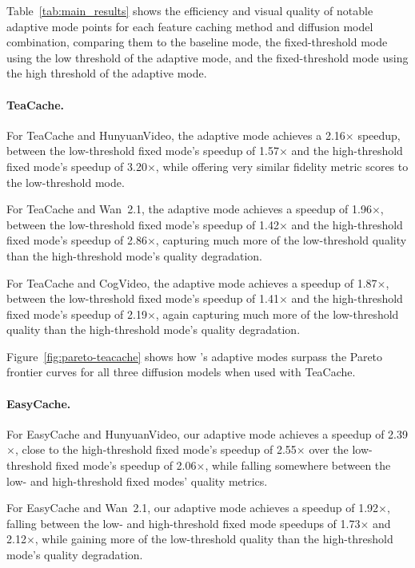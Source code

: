 \documentclass{article}
\begin{document}
Table~\ref{tab:main_results} shows the efficiency and visual quality of notable adaptive mode points for each feature caching method and diffusion model combination, comparing them to the baseline mode, the fixed-threshold mode using the low threshold of the adaptive mode, and the fixed-threshold mode using the high threshold of the adaptive mode.

\paragraph{TeaCache.}
For TeaCache and HunyuanVideo, the adaptive mode achieves a 2.16$\times$ speedup, between the low-threshold fixed mode's speedup of 1.57$\times$ and the high-threshold fixed mode's speedup of 3.20$\times$, while offering very similar fidelity metric scores to the low-threshold mode.

For TeaCache and Wan~2.1, the adaptive mode achieves a speedup of 1.96$\times$, between the low-threshold fixed mode's speedup of 1.42$\times$ and the high-threshold fixed mode's speedup of 2.86$\times$, capturing much more of the low-threshold quality than the high-threshold mode's quality degradation.

For TeaCache and CogVideo, the adaptive mode achieves a speedup of 1.87$\times$, between the low-threshold fixed mode's speedup of 1.41$\times$ and the high-threshold fixed mode's speedup of 2.19$\times$, again capturing much more of the low-threshold quality than the high-threshold mode's quality degradation.

Figure~\ref{fig:pareto-teacache} shows how \system's adaptive modes surpass the Pareto frontier curves for all three diffusion models when used with TeaCache.

\paragraph{EasyCache.}
For EasyCache and HunyuanVideo, our adaptive mode achieves a speedup of 2.39$\times$, close to the high-threshold fixed mode's speedup of 2.55$\times$ over the low-threshold fixed mode's speedup of 2.06$\times$, while falling somewhere between the low- and high-threshold fixed modes' quality metrics.

For EasyCache and Wan~2.1, our adaptive mode achieves a speedup of 1.92$\times$, falling between the low- and high-threshold fixed mode speedups of 1.73$\times$ and 2.12$\times$, while gaining more of the low-threshold quality than the high-threshold mode's quality degradation.
\end{document}
